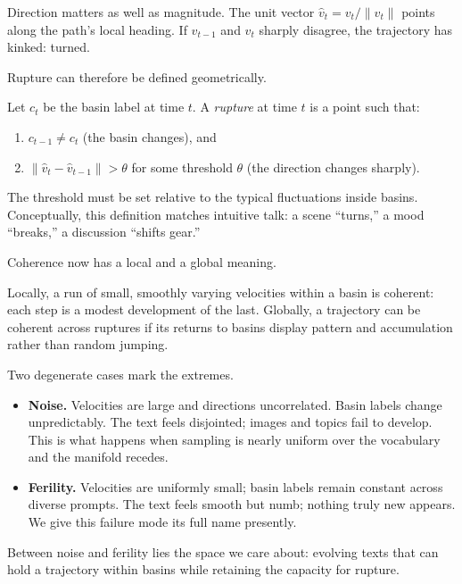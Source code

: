 \documentclass[12pt,a4paper]{article}
\begin{document}
Direction matters as well as magnitude. The unit vector $\hat{v}_t = v_t / \|v_t\|$ points along the path's local heading. If $\hat{v}_{t-1}$ and $\hat{v}_t$ sharply disagree, the trajectory has kinked: turned.

Rupture can therefore be defined geometrically.

\begin{formalbox}[title={Rupture as Kink and Crossing}]
Let $c_t$ be the basin label at time $t$. A \emph{rupture} at time $t$ is a point such that:
\begin{enumerate}
  \item $c_{t-1} \neq c_t$ (the basin changes), and
  \item $\|\hat{v}_t - \hat{v}_{t-1}\| > \theta$ for some threshold $\theta$ (the direction changes sharply).
\end{enumerate}
\end{formalbox}

The threshold must be set relative to the typical fluctuations inside basins. Conceptually, this definition matches intuitive talk: a scene ``turns,'' a mood ``breaks,'' a discussion ``shifts gear.''

Coherence now has a local and a global meaning.

Locally, a run of small, smoothly varying velocities within a basin is coherent: each step is a modest development of the last. Globally, a trajectory can be coherent across ruptures if its returns to basins display pattern and accumulation rather than random jumping.

Two degenerate cases mark the extremes.

\begin{itemize}
  \item \textbf{Noise.} Velocities are large and directions uncorrelated. Basin labels change unpredictably. The text feels disjointed; images and topics fail to develop. This is what happens when sampling is nearly uniform over the vocabulary and the manifold recedes.

  \item \textbf{Ferility.} Velocities are uniformly small; basin labels remain constant across diverse prompts. The text feels smooth but numb; nothing truly new appears. We give this failure mode its full name presently.
\end{itemize}

Between noise and ferility lies the space we care about: evolving texts that can hold a trajectory within basins while retaining the capacity for rupture.
\end{document}
